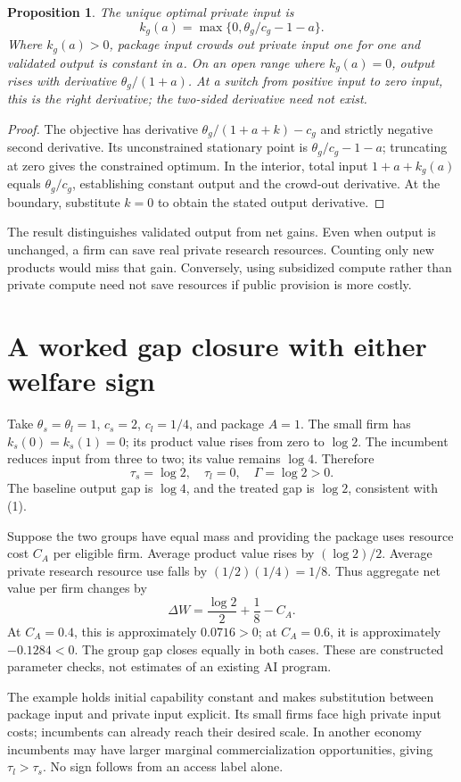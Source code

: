 \documentclass[11pt,a4paper]{article}
\newtheorem{proposition}[theorem]{Proposition}
\begin{document}
\begin{proposition}
The unique optimal private input is
\[
 k_g(a)=\max\{0,\theta_g/c_g-1-a\}.
 \tag{2}
\]
Where $k_g(a)>0$, package input crowds out private input one for one and validated output is constant in $a$. On an open range where $k_g(a)=0$, output rises with derivative $\theta_g/(1+a)$. At a switch from positive input to zero input, this is the right derivative; the two-sided derivative need not exist.
\end{proposition}
\begin{proof}
The objective has derivative $\theta_g/(1+a+k)-c_g$ and strictly negative second derivative. Its unconstrained stationary point is $\theta_g/c_g-1-a$; truncating at zero gives the constrained optimum. In the interior, total input $1+a+k_g(a)$ equals $\theta_g/c_g$, establishing constant output and the crowd-out derivative. At the boundary, substitute $k=0$ to obtain the stated output derivative.
\end{proof}
The result distinguishes validated output from net gains. Even when output is unchanged, a firm can save real private research resources. Counting only new products would miss that gain. Conversely, using subsidized compute rather than private compute need not save resources if public provision is more costly.
\section{A worked gap closure with either welfare sign}
Take $\theta_s=\theta_l=1$, $c_s=2$, $c_l=1/4$, and package $A=1$. The small firm has $k_s(0)=k_s(1)=0$; its product value rises from zero to $\log2$. The incumbent reduces input from three to two; its value remains $\log4$. Therefore
\[
 \tau_s=\log2,\quad \tau_l=0,\quad \Gamma=\log2>0.
\]
The baseline output gap is $\log4$, and the treated gap is $\log2$, consistent with (1).

Suppose the two groups have equal mass and providing the package uses resource cost $C_A$ per eligible firm. Average product value rises by $(\log2)/2$. Average private research resource use falls by $(1/2)(1/4)=1/8$. Thus aggregate net value per firm changes by
\[
 \Delta W=\frac{\log2}{2}+\frac18-C_A.
 \tag{3}
\]
At $C_A=0.4$, this is approximately $0.0716>0$; at $C_A=0.6$, it is approximately $-0.1284<0$. The group gap closes equally in both cases. These are constructed parameter checks, not estimates of an existing AI program.

The example holds initial capability constant and makes substitution between package input and private input explicit. Its small firms face high private input costs; incumbents can already reach their desired scale. In another economy incumbents may have larger marginal commercialization opportunities, giving $\tau_l>\tau_s$. No sign follows from an access label alone.
\end{document}
